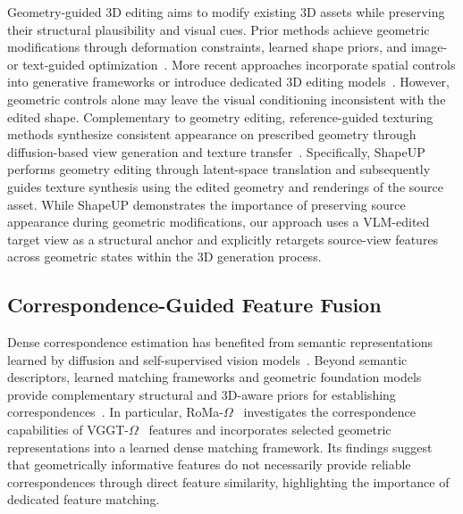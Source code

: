 Geometry-guided 3D editing aims to modify existing 3D assets while preserving their structural plausibility and visual cues.
%
Prior methods achieve geometric modifications through deformation constraints, learned shape priors, and image- or text-guided optimization~\cite{yoo2024plausible,choi2026image,kim2025meshup,dinh2025geometryinstyle}.
%
More recent approaches incorporate spatial controls into generative frameworks or introduce dedicated 3D editing models~\cite{fedele2026spacecontrol,erkoc2025preditor3d}.
%
However, geometric controls alone may leave the visual conditioning inconsistent with the edited shape.
%
Complementary to geometry editing, reference-guided texturing methods synthesize consistent appearance on prescribed geometry through diffusion-based view generation and texture transfer~\cite{chen2023text2tex,cao2023texfusion,yeh2024texturedreamer,xie2024styletex}.
%
Specifically, ShapeUP~\cite{gat2026shapeup} performs geometry editing through latent-space translation and subsequently guides texture synthesis using the edited geometry and renderings of the source asset.
%
While ShapeUP demonstrates the importance of preserving source appearance during geometric modifications, our approach uses a VLM-edited target view as a structural anchor and explicitly retargets source-view features across geometric states within the 3D generation process.





















\subsection{Correspondence-Guided Feature Fusion}

Dense correspondence estimation has benefited from semantic representations learned by diffusion and self-supervised vision models~\cite{tang2023emergent,zhang2023tale,luo2023diffusionhyperfeatures,simeoni2025dinov3}.
%
Beyond semantic descriptors, learned matching frameworks and geometric foundation models provide complementary structural and 3D-aware priors for establishing correspondences~\cite{Edstedt_2024_CVPR_roma,mast3r_eccv24,wang2025vggt,wang2026vggtomega}.
%
In particular, RoMa-$\Omega$~\cite{nordstrom2026romaomega} investigates the correspondence capabilities of VGGT-$\Omega$~\cite{wang2026vggtomega} features and incorporates selected geometric representations into a learned dense matching framework.
%
Its findings suggest that geometrically informative features do not necessarily provide reliable correspondences through direct feature similarity, highlighting the importance of dedicated feature matching.

